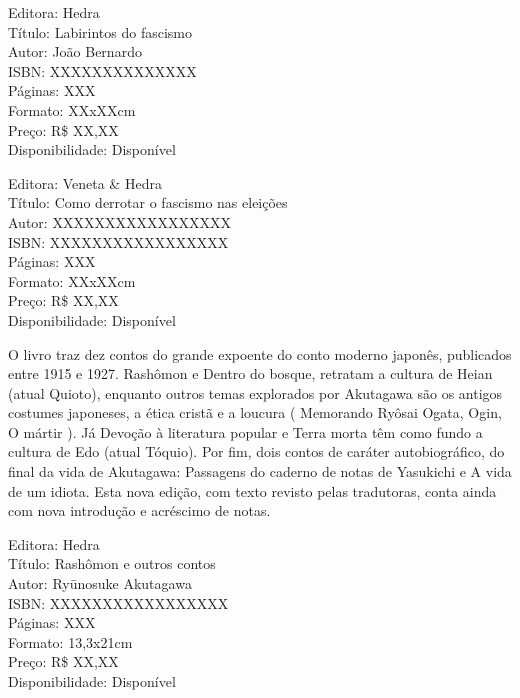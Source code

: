 \pagestyle{hedra}
\label{hedra}



\noindent{}\lipsum[1]

\begin{ficha}
Editora: Hedra\\
Título: Labirintos do fascismo\\
Autor: João Bernardo\\ 
ISBN: XXXXXXXXXXXXXX\\
Páginas: XXX\\
Formato: XXxXXcm\\
Preço: R\$ XX,XX\\
Disponibilidade: Disponível
\end{ficha}


\pagebreak


\noindent{}\lipsum[2]

\begin{ficha}
Editora: Veneta \& Hedra\\
Título: Como derrotar o fascismo nas eleições\\
Autor: XXXXXXXXXXXXXXXXX\\ 
ISBN: XXXXXXXXXXXXXXXXX\\
Páginas: XXX\\
Formato: XXxXXcm\\
Preço: R\$ XX,XX\\
Disponibilidade: Disponível
\end{ficha}


\pagebreak


\noindent{}O livro traz dez contos do grande expoente do conto moderno japonês, publicados entre 1915 e 1927. Rashômon e Dentro do bosque, retratam a cultura de Heian (atual Quioto), enquanto outros temas explorados por Akutagawa são os antigos costumes japoneses, a ética cristã e a loucura ( Memorando Ryôsai Ogata, Ogin, O mártir ). Já Devoção à literatura popular e Terra morta têm como fundo a cultura de Edo (atual Tóquio). Por fim, dois contos de caráter autobiográfico, do final da vida de Akutagawa: Passagens do caderno de notas de Yasukichi e A vida de um idiota. Esta nova edição, com texto revisto pelas tradutoras, conta ainda com nova introdução e acréscimo de notas.

\begin{ficha}
Editora: Hedra\\
Título: Rashômon e outros contos\\
Autor: Ryūnosuke Akutagawa\\ 
ISBN: XXXXXXXXXXXXXXXXX\\
Páginas: XXX\\
Formato: 13,3x21cm\\
Preço: R\$ XX,XX\\
Disponibilidade: Disponível
\end{ficha}

